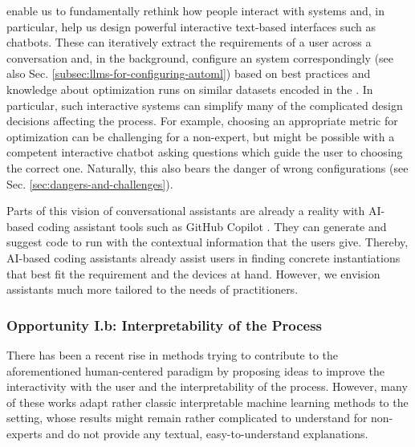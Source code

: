 \documentclass[10pt]{article} %
\begin{document}
\LLMs enable us to fundamentally rethink how people interact with \AutoML systems and, in particular, help us design powerful interactive text-based interfaces such as chatbots. These can iteratively extract the requirements of a user across a conversation and, in the background, configure an \AutoML system correspondingly (see also Sec. \ref{subsec:llms-for-configuring-automl}) based on \ML best practices and knowledge about optimization runs on similar datasets encoded in the \LLM. In particular, such interactive systems can simplify many of the complicated design decisions affecting the \AutoML process. For example, choosing an appropriate metric for optimization can be challenging for a non-expert, but might be possible with a competent interactive chatbot asking questions which guide the user to choosing the correct one. Naturally, this also bears the danger of wrong \AutoML configurations (see Sec. \ref{sec:dangers-and-challenges}).

Parts of this vision of conversational \AutoML assistants are already a reality with AI-based coding assistant tools such as GitHub Copilot \citep{copilot-github21a}. They can generate and suggest code to run \AutoML with the contextual information that the users give. Thereby, AI-based coding assistants already assist users in finding concrete \AutoML instantiations that best fit the requirement and the devices at hand. However, we envision assistants much more tailored to the needs of \ML practitioners. 

\subsubsection{Opportunity I.b: Interpretability of the \AutoML Process}
\label{subsec:interpretability-of-results}

There has been a recent rise in methods trying to contribute to the aforementioned human-centered \AutoML paradigm \citep{pfisterer-arxiv2019a,lindauer-automlorg22,moosbauer-neurips21a,moosbauer-arxiv22a,segel-automl23a} by proposing ideas to improve the interactivity with the user and the interpretability of the \AutoML process. However, many of these works adapt rather classic interpretable machine learning methods to the \AutoML setting, whose results might remain rather complicated to understand for non-experts and do not provide any textual, easy-to-understand explanations. 
\end{document}
